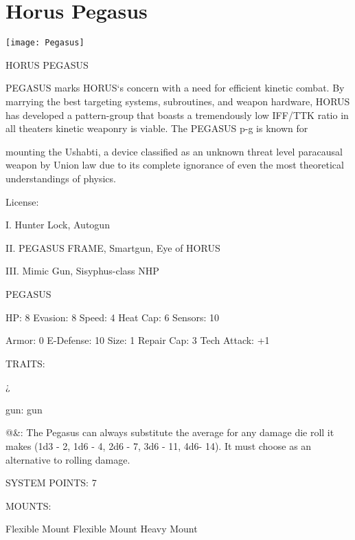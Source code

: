 \section{Horus Pegasus}

\texttt{[image: Pegasus]}

                                         HORUS PEGASUS

PEGASUS marks HORUS‘s concern with a need for efficient kinetic combat. By marrying the best targeting
systems, subroutines, and weapon hardware, HORUS has developed a pattern-group that boasts a
tremendously low IFF/TTK ratio in all theaters kinetic weaponry is viable. The PEGASUS p-g is known for

mounting the Ushabti, a device classified as an unknown threat level paracausal weapon by Union law due
to its complete ignorance of even the most theoretical understandings of physics.

                                                  License:

I. Hunter Lock, Autogun

II. PEGASUS FRAME, Smartgun, Eye of HORUS

III. Mimic Gun, Sisyphus-class NHP





                                                    PEGASUS

  HP: 8           Evasion: 8                              Speed: 4            Heat Cap: 6         Sensors: 10

  Armor: 0        E-Defense: 10                           Size: 1             Repair Cap: 3       Tech Attack:
                                                                                                  +1

                                                      TRAITS:

  ¿%

  gun: gun

  @\&: The Pegasus can always substitute the average for any damage die roll it makes  (1d3 - 2, 1d6 - 4,
  2d6 - 7, 3d6 - 11, 4d6- 14). It must choose as an alternative to rolling damage.

                                                SYSTEM POINTS: 7

                                                     MOUNTS:

  Flexible Mount                      Flexible Mount                          Heavy Mount

